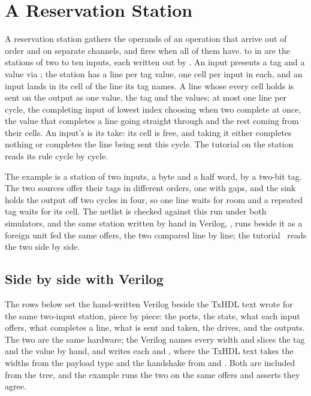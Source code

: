 \section{A Reservation Station}
\label{sec:x-station}

A reservation station gathers the operands of an operation that
arrive out of order and on separate channels, and fires when all of
them have.  to  in 
are the stations of two to ten inputs, each written out by
. An input presents a tag and a value via
; the station has a line per tag value, one cell
per input in each, and an input lands in its cell of the line its
tag names. A line whose every cell holds is sent on the output as
one value, the tag and the values; at most one line per cycle, the
completing input of lowest index choosing when two complete at once,
the value that completes a line going straight through and the rest
coming from their cells. An input's  is its take: its
cell is free, and taking it either completes nothing or completes
the line being sent this cycle. The tutorial on the
station~\cite{station} reads its rule cycle by cycle.

The example is a station of two inputs, a byte and a half word, by a
two-bit tag. The two sources offer their tags in different orders,
one with gaps, and the sink holds the output off two cycles in four,
so one line waits for room and a repeated tag waits for its cell.
The netlist is checked against this run under both simulators, and
the same station written by hand in Verilog, , runs
beside it as a foreign unit fed the same offers, the two compared
line by line; the tutorial~\cite{station} reads the two side by
side.

\subsection*{Side by side with Verilog}

The rows below set the hand-written Verilog beside the TxHDL text
 wrote for the same two-input station, piece by
piece: the ports, the state, what each input offers, what completes
a line, what is sent and taken, the drives, and the outputs. The two
are the same hardware; the Verilog names every width and slices the
tag and the value by hand, and writes each  and
, where the TxHDL text takes the widths from the payload
type and the handshake from  and . Both
are included from the tree, and the example runs the two on the same
offers and asserts they agree.

